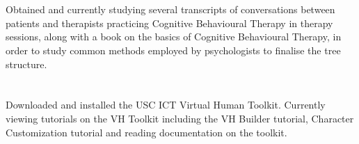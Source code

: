 \documentclass{report}
\begin{document}
     \\[-9mm]
     \paragraph{}{\fontsize{15}{18}\selectfont Obtained and currently studying several transcripts of conversations between patients and therapists practicing Cognitive Behavioural Therapy in therapy sessions, along with a book on the basics of Cognitive Behavioural Therapy, in order to study common methods employed by psychologists to finalise the tree structure.}\\[+7mm]
     
     \\[-9mm]
     \paragraph{}{\fontsize{15}{18}\selectfont Downloaded and installed the USC ICT Virtual Human Toolkit. Currently viewing tutorials on the VH Toolkit including the VH Builder tutorial, Character Customization tutorial and reading documentation on the toolkit.}
     
\end{document}
